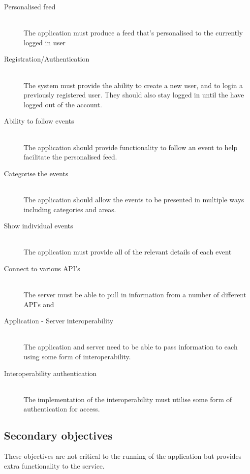 		\begin{description}
			\item[Personalised feed] \hfill \\
				The application must produce a feed that's personalised to the currently logged in user
			\item[Registration/Authentication] \hfill \\
				The system must provide the ability to create a new user, and to login a previously registered user. They should also stay logged in until the have logged out of the account.
			\item[Ability to follow events] \hfill \\
				The application should provide functionality to follow an event to help facilitate the personalised feed. 
			\item[Categorise the events] \hfill \\
				The application should allow the events to be presented in multiple ways including categories and areas. 
			\item[Show individual events] \hfill \\
				The application must provide all of the relevant details of each event
			\item[Connect to various API's] \hfill \\
				The server must be able to pull in information from a number of different API's and 
			\item[Application - Server interoperability] \hfill \\
				The application and server need to be able to pass information to each using some form of interoperability. 
			\item[Interoperability authentication] \hfill \\
				The implementation of the interoperability must utilise some form of authentication for access. 
		\end{description}

	\subsection{Secondary objectives}
		These objectives are not critical to the running of the application but provides extra functionality to the service. 

